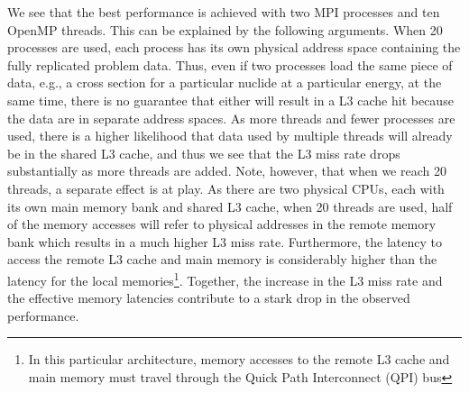 \documentclass{mc2015}
\begin{document}
We see that the best performance is achieved with two MPI processes and ten
OpenMP threads. This can be explained by the following arguments. When 20
processes are used, each process has its own physical address space containing
the fully replicated problem data. Thus, even if two processes load the same
piece of data, e.g., a cross section for a particular nuclide at a particular
energy, at the same time, there is no guarantee that either will result in a L3
cache hit because the data are in separate address spaces. As more threads and
fewer processes are used, there is a higher likelihood that data used by
multiple threads will already be in the shared L3 cache, and thus we see that
the L3 miss rate drops substantially as more threads are added. Note, however,
that when we reach 20 threads, a separate effect is at play. As there are two
physical CPUs, each with its own main memory bank and shared L3 cache, when 20
threads are used, half of the memory accesses will refer to physical addresses
in the remote memory bank which results in a much higher L3 miss
rate. Furthermore, the latency to access the remote L3 cache and main memory is
considerably higher than the latency for the local memories\footnote{In this
  particular architecture, memory accesses to the remote L3 cache and main
  memory must travel through the Quick Path Interconnect (QPI) bus}. Together,
the increase in the L3 miss rate and the effective memory latencies contribute
to a stark drop in the observed performance.
\end{document}
